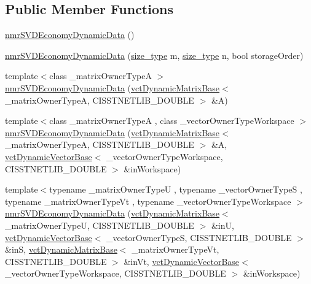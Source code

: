 \subsection*{Public Member Functions}
\begin{DoxyCompactItemize}
\item 
\hyperlink{classnmr_s_v_d_economy_dynamic_data_a3ec533053ba90b32f4d40b88ca192ef4}{nmr\+S\+V\+D\+Economy\+Dynamic\+Data} ()
\item 
\hyperlink{classnmr_s_v_d_economy_dynamic_data_a422ea4d9f2498e3314d26941c5893562}{nmr\+S\+V\+D\+Economy\+Dynamic\+Data} (\hyperlink{classnmr_s_v_d_economy_dynamic_data_aee8ff15f2e92af24fdc3c7f5908770f3}{size\+\_\+type} m, \hyperlink{classnmr_s_v_d_economy_dynamic_data_aee8ff15f2e92af24fdc3c7f5908770f3}{size\+\_\+type} n, bool storage\+Order)
\item 
{\footnotesize template$<$class \+\_\+matrix\+Owner\+Type\+A $>$ }\\\hyperlink{classnmr_s_v_d_economy_dynamic_data_ac2d9d5859f101957ee27a211c96ce8f8}{nmr\+S\+V\+D\+Economy\+Dynamic\+Data} (\hyperlink{classvct_dynamic_matrix_base}{vct\+Dynamic\+Matrix\+Base}$<$ \+\_\+matrix\+Owner\+Type\+A, C\+I\+S\+S\+T\+N\+E\+T\+L\+I\+B\+\_\+\+D\+O\+U\+B\+L\+E $>$ \&A)
\item 
{\footnotesize template$<$class \+\_\+matrix\+Owner\+Type\+A , class \+\_\+vector\+Owner\+Type\+Workspace $>$ }\\\hyperlink{classnmr_s_v_d_economy_dynamic_data_af81cb8af63fc50d52ff432281712e455}{nmr\+S\+V\+D\+Economy\+Dynamic\+Data} (\hyperlink{classvct_dynamic_matrix_base}{vct\+Dynamic\+Matrix\+Base}$<$ \+\_\+matrix\+Owner\+Type\+A, C\+I\+S\+S\+T\+N\+E\+T\+L\+I\+B\+\_\+\+D\+O\+U\+B\+L\+E $>$ \&A, \hyperlink{classvct_dynamic_vector_base}{vct\+Dynamic\+Vector\+Base}$<$ \+\_\+vector\+Owner\+Type\+Workspace, C\+I\+S\+S\+T\+N\+E\+T\+L\+I\+B\+\_\+\+D\+O\+U\+B\+L\+E $>$ \&in\+Workspace)
\item 
{\footnotesize template$<$typename \+\_\+matrix\+Owner\+Type\+U , typename \+\_\+vector\+Owner\+Type\+S , typename \+\_\+matrix\+Owner\+Type\+Vt , typename \+\_\+vector\+Owner\+Type\+Workspace $>$ }\\\hyperlink{classnmr_s_v_d_economy_dynamic_data_a700f9ed63cd971cd30c5e9f2b982e4b8}{nmr\+S\+V\+D\+Economy\+Dynamic\+Data} (\hyperlink{classvct_dynamic_matrix_base}{vct\+Dynamic\+Matrix\+Base}$<$ \+\_\+matrix\+Owner\+Type\+U, C\+I\+S\+S\+T\+N\+E\+T\+L\+I\+B\+\_\+\+D\+O\+U\+B\+L\+E $>$ \&in\+U, \hyperlink{classvct_dynamic_vector_base}{vct\+Dynamic\+Vector\+Base}$<$ \+\_\+vector\+Owner\+Type\+S, C\+I\+S\+S\+T\+N\+E\+T\+L\+I\+B\+\_\+\+D\+O\+U\+B\+L\+E $>$ \&in\+S, \hyperlink{classvct_dynamic_matrix_base}{vct\+Dynamic\+Matrix\+Base}$<$ \+\_\+matrix\+Owner\+Type\+Vt, C\+I\+S\+S\+T\+N\+E\+T\+L\+I\+B\+\_\+\+D\+O\+U\+B\+L\+E $>$ \&in\+Vt, \hyperlink{classvct_dynamic_vector_base}{vct\+Dynamic\+Vector\+Base}$<$ \+\_\+vector\+Owner\+Type\+Workspace, C\+I\+S\+S\+T\+N\+E\+T\+L\+I\+B\+\_\+\+D\+O\+U\+B\+L\+E $>$ \&in\+Workspace)

\end{DoxyCompactItemize}
